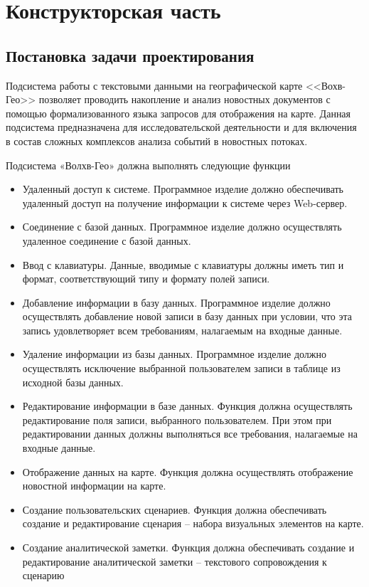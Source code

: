\section{Конструкторская часть}

\subsection{Постановка задачи проектирования}

Подсистема работы с текстовыми данными на географической карте <<Вохв-Гео>> позволяет проводить накопление и анализ новостных документов с помощью формализованного языка запросов для отображения на карте. Данная подсистема предназначена для исследовательской деятельности и для включения в состав сложных комплексов анализа событий в новостных потоках.

Подсистема «Волхв-Гео» должна выполнять следующие функции
\begin{itemize}
\item Удаленный доступ к системе. Программное изделие должно обеспечивать удаленный доступ на получение информации к системе через Web-сервер.
\item Соединение с базой данных. Программное изделие должно осуществлять удаленное соединение с базой данных.
\item Ввод с клавиатуры. Данные, вводимые с клавиатуры должны иметь тип и формат, соответствующий типу и формату полей записи.
\item Добавление информации в базу данных. Программное изделие должно осуществлять добавление новой записи в базу данных при условии, что эта запись удовлетворяет всем требованиям, налагаемым на входные данные.
\item Удаление информации из базы данных. Программное изделие должно осуществлять исключение выбранной пользователем записи в таблице из исходной базы данных.
\item Редактирование информации в базе данных. Функция должна осуществлять редактирование поля записи, выбранного пользователем. При этом при редактировании данных должны выполняться все требования, налагаемые на входные данные.
\item Отображение данных на карте. Функция должна осуществлять отображение новостной информации на карте.
\item Создание пользовательских сценариев. Функция должна обеспечивать создание и редактирование сценария – набора визуальных элементов на карте.
\item Создание аналитической заметки. Функция должна обеспечивать создание и редактирование аналитической заметки – текстового сопровождения к сценарию
\end{itemize}


